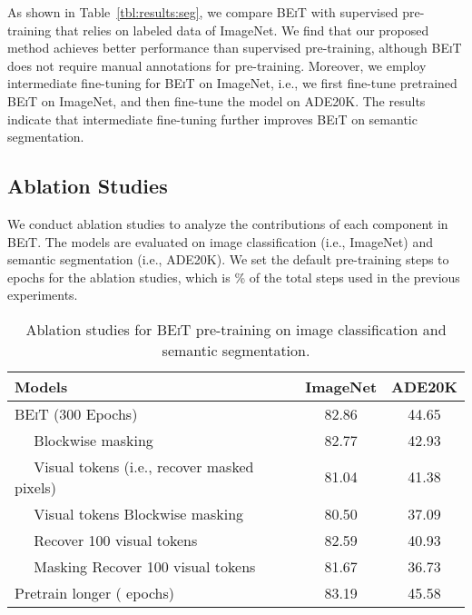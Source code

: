 \documentclass{article}
\newcommand\our{\textsc{BEiT}}
\begin{document}
As shown in Table~\ref{tbl:results:seg}, we compare \our{} with supervised pre-training that relies on labeled data of ImageNet.
We find that our proposed method achieves better performance than supervised pre-training, although \our{} does not require manual annotations for pre-training.
Moreover, we employ intermediate fine-tuning for \our{} on ImageNet, i.e., we first fine-tune pretrained \our{} on ImageNet, and then fine-tune the model on ADE20K.
The results indicate that intermediate fine-tuning further improves \our{} on semantic segmentation.


\subsection{Ablation Studies}
\label{sec:ablation}

We conduct ablation studies to analyze the contributions of each component in \our{}.
The models are evaluated on image classification (i.e., ImageNet) and semantic segmentation (i.e., ADE20K).
We set the default pre-training steps to  epochs for the ablation studies, which is \% of the total steps used in the previous experiments.


\begin{table}[t]
\centering
\begin{tabular}{l c c}
\toprule
\bf Models & \bf ImageNet & \bf ADE20K \\
\midrule
\our{} (300 Epochs)                               & 82.86 & 44.65 \\
\midrule
~~ Blockwise masking                           & 82.77 & 42.93 \\
~~ Visual tokens (i.e., recover masked pixels) & 81.04 & 41.38 \\
~~ Visual tokens  Blockwise masking         & 80.50 & 37.09 \\
~~ Recover 100 visual tokens               & 82.59 & 40.93 \\
~~ Masking  Recover 100 visual tokens   & 81.67 & 36.73 \\
\midrule
Pretrain longer ( epochs)                    & 83.19 & 45.58 \\
\bottomrule
\end{tabular}
\caption{Ablation studies for \our{} pre-training on image classification and semantic segmentation.}
\label{tbl:ablation}
\end{table}
\end{document}
